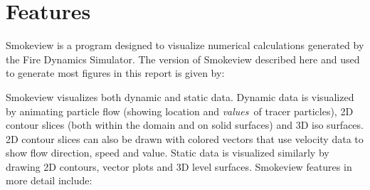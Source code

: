 \documentclass[11pt,twoside]{book}
\begin{document}
\section{Features}

Smokeview is a program designed to visualize numerical
calculations generated by the Fire Dynamics Simulator.
The version of Smokeview described here and used
to generate most figures in this report is given by:
{

}

Smokeview visualizes both dynamic and static data.  Dynamic
data is visualized by animating particle flow (showing
location and {\em values}\ of tracer particles), 2D contour
slices (both within the domain and on solid surfaces) and
3D iso surfaces.  2D contour slices can also be drawn
with colored vectors that use velocity data to show flow
direction, speed and value. Static data is visualized
similarly by drawing 2D contours, vector plots and 3D level
surfaces. Smokeview features in more detail include:
\end{document}
